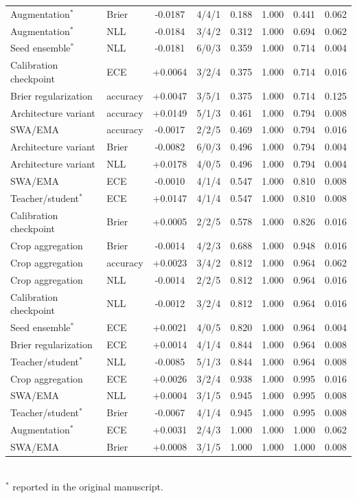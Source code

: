 \begin{table}[t]
\begin{tabular}{llcccccc}
Augmentation$^{*}$ & Brier & -0.0187 & 4/4/1 & 0.188 & 1.000 & 0.441 & 0.062 \\
Augmentation$^{*}$ & NLL & -0.0184 & 3/4/2 & 0.312 & 1.000 & 0.694 & 0.062 \\
Seed ensemble$^{*}$ & NLL & -0.0181 & 6/0/3 & 0.359 & 1.000 & 0.714 & 0.004 \\
Calibration checkpoint & ECE & +0.0064 & 3/2/4 & 0.375 & 1.000 & 0.714 & 0.016 \\
Brier regularization & accuracy & +0.0047 & 3/5/1 & 0.375 & 1.000 & 0.714 & 0.125 \\
Architecture variant & accuracy & +0.0149 & 5/1/3 & 0.461 & 1.000 & 0.794 & 0.008 \\
SWA/EMA & accuracy & -0.0017 & 2/2/5 & 0.469 & 1.000 & 0.794 & 0.016 \\
Architecture variant & Brier & -0.0082 & 6/0/3 & 0.496 & 1.000 & 0.794 & 0.004 \\
Architecture variant & NLL & +0.0178 & 4/0/5 & 0.496 & 1.000 & 0.794 & 0.004 \\
SWA/EMA & ECE & -0.0010 & 4/1/4 & 0.547 & 1.000 & 0.810 & 0.008 \\
Teacher/student$^{*}$ & ECE & +0.0147 & 4/1/4 & 0.547 & 1.000 & 0.810 & 0.008 \\
Calibration checkpoint & Brier & +0.0005 & 2/2/5 & 0.578 & 1.000 & 0.826 & 0.016 \\
Crop aggregation & Brier & -0.0014 & 4/2/3 & 0.688 & 1.000 & 0.948 & 0.016 \\
Crop aggregation & accuracy & +0.0023 & 3/4/2 & 0.812 & 1.000 & 0.964 & 0.062 \\
Crop aggregation & NLL & -0.0014 & 2/2/5 & 0.812 & 1.000 & 0.964 & 0.016 \\
Calibration checkpoint & NLL & -0.0012 & 3/2/4 & 0.812 & 1.000 & 0.964 & 0.016 \\
Seed ensemble$^{*}$ & ECE & +0.0021 & 4/0/5 & 0.820 & 1.000 & 0.964 & 0.004 \\
Brier regularization & ECE & +0.0014 & 4/1/4 & 0.844 & 1.000 & 0.964 & 0.008 \\
Teacher/student$^{*}$ & NLL & -0.0085 & 5/1/3 & 0.844 & 1.000 & 0.964 & 0.008 \\
Crop aggregation & ECE & +0.0026 & 3/2/4 & 0.938 & 1.000 & 0.995 & 0.016 \\
SWA/EMA & NLL & +0.0004 & 3/1/5 & 0.945 & 1.000 & 0.995 & 0.008 \\
Teacher/student$^{*}$ & Brier & -0.0067 & 4/1/4 & 0.945 & 1.000 & 0.995 & 0.008 \\
Augmentation$^{*}$ & ECE & +0.0031 & 2/4/3 & 1.000 & 1.000 & 1.000 & 0.062 \\
SWA/EMA & Brier & +0.0008 & 3/1/5 & 1.000 & 1.000 & 1.000 & 0.008 \\
\bottomrule
\end{tabular}
\\[2pt]
\footnotesize $^{*}$ reported in the original manuscript.
\end{table}